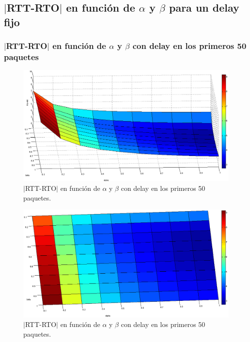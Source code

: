 \documentclass[10pt, a4paper]{article}
\begin{document}
\subsection{$|$RTT-RTO$|$ en función de $\alpha$ y $\beta$ para un delay fijo}

\subsubsection{$|$RTT-RTO$|$ en función de $\alpha$ y $\beta$ con delay en los primeros 50 paquetes}
\begin{figure}[H]
\begin{center}
\includegraphics[width=17cm]{delay-50F.png}
\caption{$|$RTT-RTO$|$ en función de $\alpha$ y $\beta$ con delay en los primeros 50 paquetes.}
\end{center}
\end{figure}

\begin{figure}[H]
\begin{center}
\includegraphics[width=17cm]{delay-50F-costado.png}
\caption{$|$RTT-RTO$|$ en función de $\alpha$ y $\beta$ con delay en los primeros 50 paquetes.}
\end{center}
\end{figure}
\end{document}
